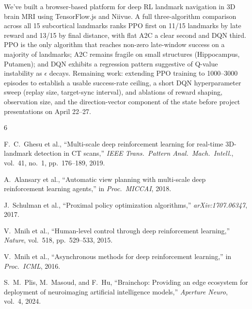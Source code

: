 \documentclass[11pt]{article}
\begin{document}
We've built a browser-based platform for deep RL landmark navigation in 3D brain MRI using TensorFlow.js and Niivue. A full three-algorithm comparison across all 15 subcortical landmarks ranks PPO first on 11/15 landmarks by late reward and 13/15 by final distance, with flat A2C a clear second and DQN third. PPO is the only algorithm that reaches non-zero late-window success on a majority of landmarks; A2C remains fragile on small structures (Hippocampus, Putamen); and DQN exhibits a regression pattern suggestive of Q-value instability as $\epsilon$ decays. Remaining work: extending PPO training to 1000--3000 episodes to establish a usable success-rate ceiling, a short DQN hyperparameter sweep (replay size, target-sync interval), and ablations of reward shaping, observation size, and the direction-vector component of the state before project presentations on April 22--27.

\begin{thebibliography}{6}

F.~C.~Ghesu et al., ``Multi-scale deep reinforcement learning for real-time 3D-landmark detection in CT scans,'' \textit{IEEE Trans.\ Pattern Anal.\ Mach.\ Intell.}, vol.~41, no.~1, pp.~176--189, 2019.

A.~Alansary et al., ``Automatic view planning with multi-scale deep reinforcement learning agents,'' in \textit{Proc.\ MICCAI}, 2018.

J.~Schulman et al., ``Proximal policy optimization algorithms,'' \textit{arXiv:1707.06347}, 2017.

V.~Mnih et al., ``Human-level control through deep reinforcement learning,'' \textit{Nature}, vol.~518, pp.~529--533, 2015.

V.~Mnih et al., ``Asynchronous methods for deep reinforcement learning,'' in \textit{Proc.\ ICML}, 2016.

S.~M.~Plis, M.~Masoud, and F.~Hu, ``Brainchop: Providing an edge ecosystem for deployment of neuroimaging artificial intelligence models,'' \textit{Aperture Neuro}, vol.~4, 2024.

\end{thebibliography}
\end{document}
